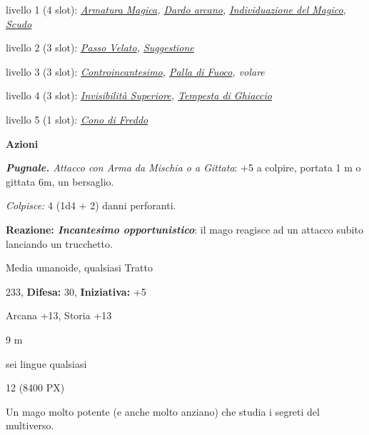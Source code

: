 \begin{multicols}{2}
{livello 1 (4 slot): \emph{\hyperlink{Armatura Magica}{Armatura Magica}, \hyperlink{Dardo arcano}{Dardo arcano}, \hyperlink{Individuazione del Magico}{Individuazione del Magico}, \hyperlink{Scudo}{Scudo}}

livello 2 (3 slot): \emph{\hyperlink{Passo Velato}{Passo Velato}, \hyperlink{Suggestione}{Suggestione}}

livello 3 (3 slot): \emph{\hyperlink{Controincantesimo}{Controincantesimo}, \hyperlink{Palla di Fuoco}{Palla di Fuoco}, volare}

livello 4 (3 slot): \emph{\hyperlink{Invisibilità Superiore}{Invisibilità Superiore}, \hyperlink{Tempesta di Ghiaccio}{Tempesta di Ghiaccio}}

livello 5 (1 slot): \emph{\hyperlink{Cono di Freddo}{Cono di Freddo}}

\textbf{Azioni}

\emph{\textbf{Pugnale.} Attacco con Arma da Mischia o a Gittata}: +5 a colpire, portata 1 m o gittata 6m, un bersaglio.

\emph{Colpisce:} 4 (1d4 + 2) danni perforanti.

\textbf{Reazione: \emph{Incantesimo opportunistico}}: il mago reagisce ad un attacco subito lanciando un trucchetto.

\begin{description}[noitemsep, topsep=0pt, parsep=0pt, partopsep=0pt, leftmargin=0cm, labelwidth=2.2cm]
    \item[\textbf{Taglia/Tipo:}] Media umanoide, qualsiasi Tratto
    \item[\textbf{Caratt.:}] 
    \item[\textbf{Punti Ferita:}] 233,  \textbf{Difesa:} 30,  \textbf{Iniziativa:} +5
    \item[\textbf{Comp.:}] Arcana +13, Storia +13
    \item[\textbf{Tiri Salvez.:}] 
    \item[\textbf{Movimento:}] 9 m
    \item[\textbf{Linguaggi:}] sei lingue qualsiasi
    \item[\textbf{Sfida:}] 12 (8400 PX)\smallskip
\end{description}

Un mago molto potente (e anche molto anziano) che studia i segreti del multiverso.

}
\end{multicols}
